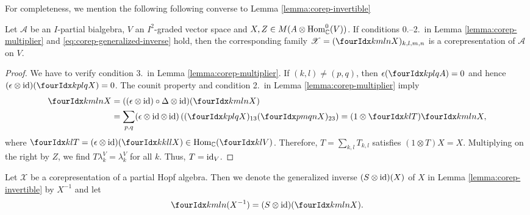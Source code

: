 For completeness, we mention the following following converse to Lemma \ref{lemma:corep-invertible}
\begin{Lem}
  Let $\mathscr{A}$ be an $I$-partial bialgebra,  $V$  an
  $I^{2}$-graded vector space and $X,Z \in M(A \otimes
  \operatorname{Hom}_{\mathbb{C}}^{0}(V))$. If  conditions 0.--2.\ in Lemma
  \ref{lemma:corep-multiplier} and
  \eqref{eq:corep-generalized-inverse} hold, then the corresponding family
  $\mathscr{X}=(\Gr{X}{k}{l}{m}{n})_{k,l,m,n}$ is a corepresentation
  of $\mathscr{A}$ on $V$.
\end{Lem}
\begin{proof}
  We have to verify condition 3.\ in Lemma
  \ref{lemma:corep-multiplier}.  If $(k,l) \neq (p,q)$, then
  $\epsilon(\Gr{A}{k}{l}{p}{q})=0$ and hence $(\epsilon
  \otimes \id)(\Gr{X}{k}{l}{p}{q}) =0$. The counit property and condition
  2.\ in Lemma \ref{lemma:corep-multiplier} imply 
\begin{align*}
  \Gr{X}{k}{l}{m}{n} &= ((\epsilon\otimes \id)\circ  \Delta \otimes
  \id)(  \Gr{X}{k}{l}{m}{n}) 
\\ &  = \sum_{p,q} (\epsilon\otimes \id \otimes
  \id)\left((\Gr{X}{k}{l}{p}{q})_{13}(\Gr{X}{p}{q}{m}{n})_{23}\right)
  =  (1 \otimes \Gru{T}{k}{l})\Gr{X}{k}{l}{m}{n},
\end{align*}
where $\Gru{T}{k}{l}=(\epsilon \otimes \id)(\Gr{X}{k}{l}{k}{l}) \in
\Hom_{\C}(\Gru{V}{k}{l})$.  Therefore,  $T=\sum_{k,l} T_{k,l}$  satisfies $(1 \otimes T)X =
X$. Multiplying on the right by $Z$, we find
$T\lambda^{V}_{k}=\lambda^{V}_{k}$ for all $k$. Thus, $T=\operatorname{id}_{V}$.
\end{proof}
\begin{Def}
  Let $\mathscr{X}$ be a corepresentation of a partial Hopf
  algebra. Then we denote the generalized inverse $(S \otimes \operatorname{id})(X)$
  of $X$ in Lemma \ref{lemma:corep-invertible} by $X^{-1}$ and let
  \begin{align*}
   \Gr{(X^{-1})}{k}{l}{m}{n}=(S \otimes \id)(\Gr{X}{k}{l}{m}{n}). 
  \end{align*}
\end{Def}

